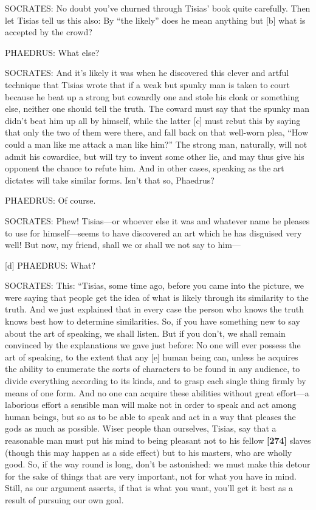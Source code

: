 SOCRATES: No doubt you've churned through Tisias' book quite carefully.
Then let Tisias tell us this also: By “the likely” does he mean anything
but {[}b{]} what is accepted by the crowd?

PHAEDRUS: What else?

SOCRATES: And it's likely it was when he discovered this clever and
artful technique that Tisias wrote that if a weak but spunky man is
taken to court because he beat up a strong but cowardly one and stole
his cloak or something else, neither one should tell the truth. The
coward must say that the spunky man didn't beat him up all by himself,
while the latter {[}c{]} must rebut this by saying that only the two of
them were there, and fall back on that well-worn plea, “How could a man
like me attack a man like him?” The strong man, naturally, will not
admit his cowardice, but will try to invent some other lie, and may thus
give his opponent the chance to refute him. And in other cases, speaking
as the art dictates will take similar forms. Isn't that so, Phaedrus?

PHAEDRUS: Of course.

SOCRATES: Phew! Tisias---or whoever else it was and whatever name he
pleases to use for
himself---seems
to have discovered an art which he has disguised very well! But now, my
friend, shall we or shall we not say to him---

{[}d{]} PHAEDRUS: What?

SOCRATES: This: “Tisias, some time ago, before you came into the
picture, we were saying that people get the idea of what is likely
through its similarity to the truth. And we just explained that in every
case the person who knows the truth knows best how to determine
similarities. So, if you have something new to say about the art of
speaking, we shall listen. But if you don't, we shall remain convinced
by the explanations we gave just before: No one will ever possess the
art of speaking, to the extent that any {[}e{]} human being can, unless
he acquires the ability to enumerate the sorts of characters to be found
in any audience, to divide everything according to its kinds, and to
grasp each single thing firmly by means of one form. And no one can
acquire these abilities without great effort---a laborious effort a
sensible man will make not in order to speak and act among human beings,
but so as to be able to speak and act in a way that pleases the gods as
much as possible. Wiser people than ourselves, Tisias, say that a
reasonable man must put his mind to being pleasant not to his fellow
{\bf {[}274{]}} slaves (though this may happen as a side effect) but to
his masters, who are wholly good. So, if the way round is long, don't be
astonished: we must make this detour for the sake of things that are
very important, not for what you have in mind. Still, as our argument
asserts, if that is what you want, you'll get it best as a result of
pursuing our own goal.

